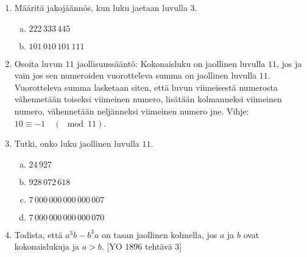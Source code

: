 \begin{enumerate}
\item
Määritä jakojäännös, kun luku jaetaan luvulla $3$.
\begin{enumerate}[a)]
\item $222\, 333\, 445$
\item $101\, 010\, 101\, 111$
\end{enumerate}

\item
Osoita luvun $11$ jaollisuussääntö: Kokonaisluku on jaollinen luvulla $11$, jos ja vain jos sen numeroiden vuorotteleva summa on jaollinen luvulla $11$. Vuorotteleva summa lasketaan siten, että luvun viimeisestä numerosta vähennetään toiseksi viimeinen numero, lisätään kolmanneksi viimeinen numero, vähennetään neljänneksi viimeinen numero jne. Vihje: $10\equiv -1\quad(\mod 11)$.

\item Tutki, onko luku jaollinen luvulla $11$.
\begin{enumerate}[a)]
\item $24\, 927$
\item $928\, 072\, 618$
\item $7\, 000\, 000\, 000\, 000\, 007$
\item $7\, 000\, 000\, 000\, 000\, 070$
\end{enumerate}

\item Todista, että $a^3b-b^3a$ on tasan jaollinen kolmella, jos $a$ ja $b$ ovat kokonaislukuja ja $a>b$. 
[YO 1896 tehtävä 3]

\end{enumerate}

\newpage
